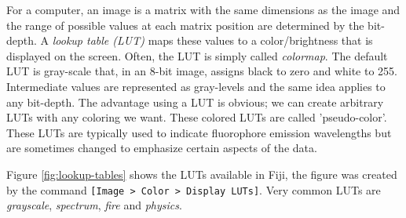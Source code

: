 For a computer, an image is a matrix with the same dimensions as the image and the range of possible values at each matrix position are determined by the bit-depth. A \emph{lookup table (LUT)} maps these values to a color/brightness that is displayed on the screen. Often, the LUT is simply called \emph{colormap}. The default LUT is gray-scale that, in an 8-bit image, assigns black to zero and white to 255. Intermediate values are represented as gray-levels and the same idea applies to any bit-depth.
The advantage using a LUT is obvious; we can create arbitrary LUTs with any coloring we want. These colored LUTs are called 'pseudo-color'. These LUTs are typically used to indicate fluorophore emission wavelengths but are sometimes changed to emphasize certain aspects of the data.

Figure \ref{fig:lookup-tables} shows the LUTs available in Fiji, the figure was created by the command \texttt{[Image > Color > Display LUTs]}. Very common LUTs are \emph{grayscale}, \emph{spectrum}, \emph{fire} and \emph{physics}.

